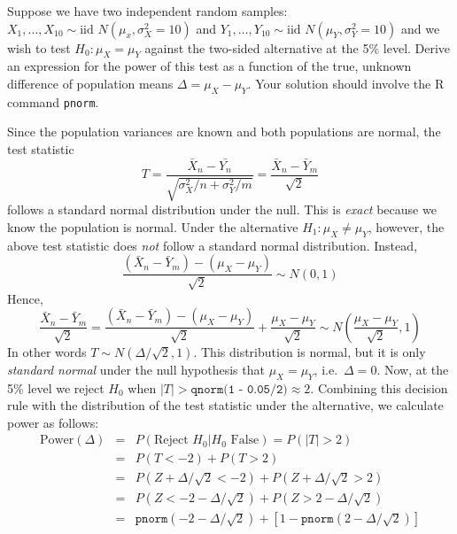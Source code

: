 \documentclass[addpoints,12pt]{exam}
\begin{document}
\begin{questions}
\question Suppose we have two independent random samples: $X_1, \hdots, X_{10} \sim \mbox{iid } N(\mu_x, \sigma_X^2 = 10)$ and $Y_1, \hdots, Y_{10} \sim \mbox{iid } N(\mu_Y, \sigma_Y^2 = 10)$
and we wish to test $H_0\colon \mu_X = \mu_Y$ against the two-sided alternative at the 5\% level. 
Derive an expression for the power of this test as a function of the true, unknown difference of population means $\Delta = \mu_X - \mu_Y$.
Your solution should involve the R command \texttt{pnorm}. 
\begin{solution}[4in]
			Since the population variances are known and both populations are normal, the test statistic
				$$T = \frac{\bar{X}_n - \bar{Y_n}}{\sqrt{\sigma_X^2/n + \sigma_Y^2/m}} = \frac{\bar{X}_n - \bar{Y}_m}{\sqrt{2}}$$
			follows a standard normal distribution under the null. This is \emph{exact} because we know the population is normal. Under the alternative $H_1\colon \mu_X \neq \mu_Y$, however, the above test statistic does \emph{not} follow a standard normal distribution. Instead,
					$$\frac{(\bar{X}_n - \bar{Y}_m) - (\mu_X - \mu_Y)}{\sqrt{2}}  \sim N(0,1)$$
					Hence, 
					$$\frac{\bar{X}_n - \bar{Y}_m}{\sqrt{2}} = \frac{(\bar{X}_n - \bar{Y}_m) - (\mu_X - \mu_Y)}{\sqrt{2}}  + \frac{\mu_X - \mu_Y}{\sqrt{2}}  \sim N\left(\frac{\mu_X - \mu_Y}{\sqrt{2}} , 1\right)$$
					In other words $T \sim N(\Delta/\sqrt{2}, 1)$. This distribution is normal, but it is only \emph{standard normal} under the null hypothesis that $\mu_X = \mu_Y$, i.e.\ $\Delta = 0$. 
		Now, at the 5\% level we reject $H_0$ when $|T| > \texttt{qnorm(1 - 0.05/2)}\approx 2$.
					Combining this decision rule with the distribution of the test statistic under the alternative, we calculate power as follows:
					\begin{eqnarray*}
						\mbox{Power}(\Delta) &=& P(\mbox{Reject } H_0|H_0 \mbox{ False})= P(|T|>2)\\
            &=& P(T < -2) + P(T > 2) \\
            &=& P(Z + \Delta/\sqrt{2} < -2) +P(Z + \Delta/\sqrt{2} > 2)\\
            &=& P(Z < -2 - \Delta/\sqrt{2}) +P(Z> 2 - \Delta/\sqrt{2})\\
            &=& \texttt{pnorm}(-2 - \Delta/\sqrt{2}) + \left[1 - \texttt{pnorm}(2 - \Delta/\sqrt{2})\right]
					\end{eqnarray*}
			\end{solution}


\end{questions}
\end{document}
